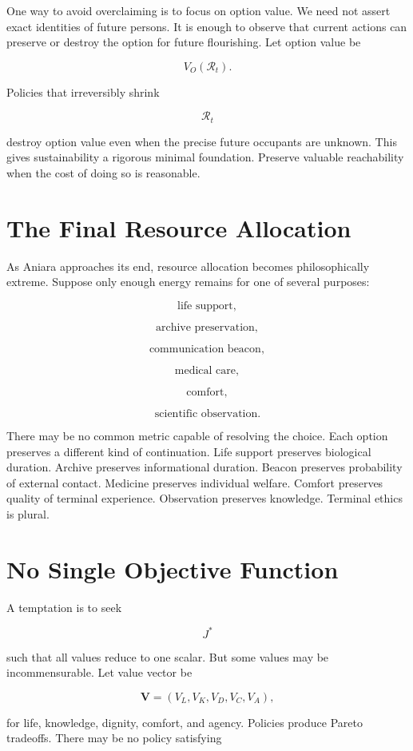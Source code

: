 \documentclass[11pt,oneside]{book}
\theoremstyle{definition}
\theoremstyle{remark}
\newcommand{\R}{\mathcal{R}}
\begin{document}
One way to avoid overclaiming is to focus on option value. We need not assert exact identities of
future persons. It is enough to observe that current actions can preserve or destroy the option for
future flourishing. Let option value be

\[
V_O(\R_t).
\]

Policies that irreversibly shrink

\[
\R_t
\]

destroy option value even when the precise future occupants are unknown. This gives sustainability a
rigorous minimal foundation. Preserve valuable reachability when the cost of doing so is reasonable.

\section{The Final Resource Allocation}

As Aniara approaches its end, resource allocation becomes philosophically extreme. Suppose only
enough energy remains for one of several purposes:

\[
\text{life support},
\]

\[
\text{archive preservation},
\]

\[
\text{communication beacon},
\]

\[
\text{medical care},
\]

\[
\text{comfort},
\]

\[
\text{scientific observation}.
\]

There may be no common metric capable of resolving the choice. Each option preserves a different
kind of continuation. Life support preserves biological duration. Archive preserves informational
duration. Beacon preserves probability of external contact. Medicine preserves individual welfare.
Comfort preserves quality of terminal experience. Observation preserves knowledge. Terminal ethics
is plural.

\section{No Single Objective Function}

A temptation is to seek

\[
J^\ast
\]

such that all values reduce to one scalar. But some values may be incommensurable. Let value vector
be

\[
\mathbf V = (V_L,V_K,V_D,V_C,V_A),
\]

for life, knowledge, dignity, comfort, and agency. Policies produce Pareto tradeoffs. There may be
no policy satisfying
\end{document}
